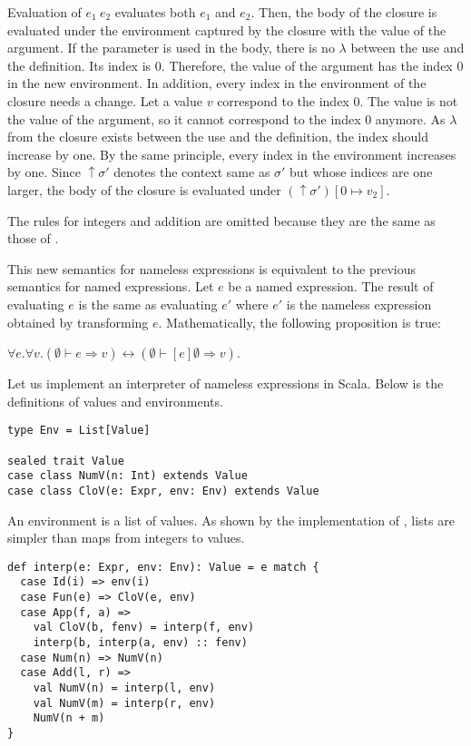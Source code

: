 Evaluation of $e_1\ e_2$ evaluates both $e_1$ and $e_2$. Then, the body of the
closure is evaluated under the environment captured by the closure with the value
of the argument. If the parameter is used in the body, there is no $\lambda$
between the use and the definition. Its index is 0. Therefore, the value of the
argument has the index 0 in the new environment. In addition, every index in the
environment of the closure needs a change. Let a value $v$ correspond to the
index 0. The value is not the value of the argument, so it cannot correspond to
the index 0 anymore. As $\lambda$ from the closure exists between the use and the
definition, the index should increase by one. By the same principle, every index
in the environment increases by one. Since $\uparrow\sigma'$ denotes the context
same as $\sigma'$ but whose indices are one larger, the body of the closure
is evaluated under $(\uparrow\sigma')[0\mapsto v_2]$.

The rules for integers and addition are omitted because they are the same as those
of \lang.

This new semantics for nameless expressions is equivalent to the previous
semantics for named expressions.
Let $e$ be a named expression. The result of evaluating $e$ is the same as
evaluating $e'$ where $e'$ is the nameless expression obtained by transforming $e$.
Mathematically, the following proposition is true:

$\forall e.\forall v.(\emptyset\vdash e\Rightarrow
v)\leftrightarrow(\emptyset\vdash[e]\emptyset\Rightarrow v)$.

Let us implement an interpreter of nameless expressions in Scala.
Below is the definitions of values and environments.

\begin{verbatim}
type Env = List[Value]

sealed trait Value
case class NumV(n: Int) extends Value
case class CloV(e: Expr, env: Env) extends Value
\end{verbatim}

An environment is a list of values. As shown by the implementation of
, lists are simpler than maps from integers to values.

\begin{verbatim}
def interp(e: Expr, env: Env): Value = e match {
  case Id(i) => env(i)
  case Fun(e) => CloV(e, env)
  case App(f, a) =>
    val CloV(b, fenv) = interp(f, env)
    interp(b, interp(a, env) :: fenv)
  case Num(n) => NumV(n)
  case Add(l, r) =>
    val NumV(n) = interp(l, env)
    val NumV(m) = interp(r, env)
    NumV(n + m)
}
\end{verbatim}


